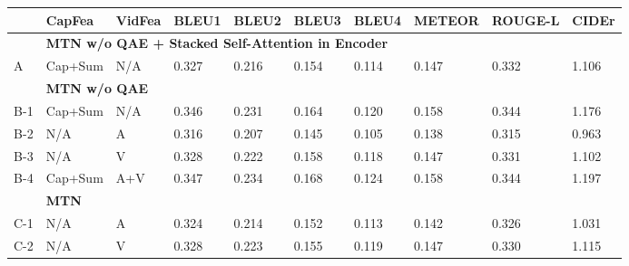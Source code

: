 \documentclass[11pt,a4paper]{article}
\begin{document}
\begin{table*}[htbp]
	\centering
	\resizebox{1.0\textwidth}{!} {
	\begin{tabular}{p{0.1cm}p{1.2cm}llllllll}
\hline
                                         & \textbf{CapFea}       & \textbf{VidFea} & \textbf{BLEU1} & \textbf{BLEU2} & \textbf{BLEU3} & \textbf{BLEU4} & \textbf{METEOR} & \textbf{ROUGE-L} & \textbf{CIDEr} \\ \hline
                                         & \multicolumn{9}{l}{\textbf{MTN w/o QAE + Stacked Self-Attention in Encoder}}                                                                                                  \\ \hline
A                                      & Cap+Sum               & N/A             & 0.327          & 0.216          & 0.154          & 0.114          & 0.147           & 0.332            & 1.106          \\ \hline
                                         & \multicolumn{9}{l}{\textbf{MTN w/o QAE}}   \\ \hline
\multicolumn{1}{c}{B-1} & Cap+Sum               & N/A             & 0.346          & 0.231          & 0.164          & 0.120          & 0.158           & 0.344            & 1.176          \\ 
\multicolumn{1}{c}{B-2}                     & N/A                   & A               & 0.316          & 0.207          & 0.145          & 0.105          & 0.138           & 0.315            & 0.963          \\  
\multicolumn{1}{c}{B-3}                     & N/A                   & V               & 0.328          & 0.222          & 0.158          & 0.118          & 0.147           & 0.331            & 1.102          \\ 
\multicolumn{1}{c}{B-4}                     & Cap+Sum               & A+V             & 0.347          & 0.234          & 0.168          & 0.124          & 0.158           & 0.344            & 1.197          \\ \hline
                                         & \multicolumn{9}{l}{\textbf{MTN}}                                                                                    \\ \hline
\multicolumn{1}{c}{C-1}                     & N/A                   & A               & 0.324          & 0.214          & 0.152          & 0.113          & 0.142           & 0.326            & 1.031          \\ 
\multicolumn{1}{c}{C-2}                                         & N/A                   & V               & 0.328          & 0.223          & 0.155          & 0.119          & 0.147           & 0.330            & 1.115          \\ 

\end{tabular}}
\end{table*}
\end{document}
